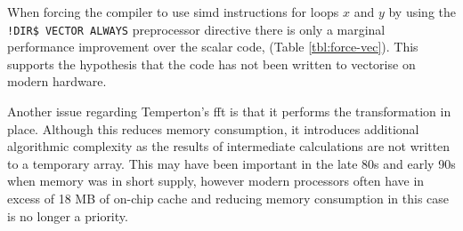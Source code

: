 \documentclass[a4paper,11pt]{report}
\begin{document}
\par
When forcing the compiler to use \gls{simd} instructions for loops $x$ and $y$ by using the \texttt{!DIR\$ VECTOR ALWAYS} preprocessor directive there is only a marginal performance improvement over the scalar code, (Table \ref{tbl:force-vec}). This supports the hypothesis that the code has not been written to vectorise on modern hardware. 
\par
Another issue regarding Temperton's \gls{fft} is that it performs the transformation in place. Although this reduces memory consumption, it introduces additional algorithmic complexity as the results of intermediate calculations are not written to a temporary array. This may have been important in the late 80s and early 90s when memory was in short supply, however modern processors often have in excess of 18 MB of on-chip cache and reducing memory consumption in this case is no longer a priority. 


\end{document}
